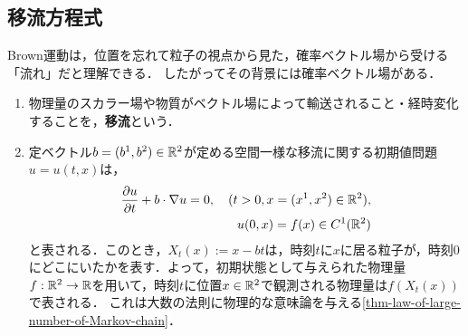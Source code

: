 \documentclass[uplatex,dvipdfmx]{jsreport}
\begin{document}
\subsection{移流方程式}

\begin{tcolorbox}[colframe=ForestGreen, colback=ForestGreen!10!white,breakable,colbacktitle=ForestGreen!40!white,coltitle=black,fonttitle=\bfseries\sffamily,
title=]
    Brown運動は，位置を忘れて粒子の視点から見た，確率ベクトル場から受ける「流れ」だと理解できる．
    したがってその背景には確率ベクトル場がある．
\end{tcolorbox}

\begin{definition}\mbox{}
    \begin{enumerate}
        \item 物理量のスカラー場や物質がベクトル場によって輸送されること・経時変化することを，\textbf{移流}という．
        \item 定ベクトル$b=(b^1,b^2)\in\mathbb{R}^2$が定める空間一様な移流に関する初期値問題$u=u(t,x)$は，
        \begin{align*}
            \frac{\partial u}{\partial t}+b\cdot\nabla u=0,\quad(t>0,x=(x^1,x^2)\in\mathbb{R}^2),\\
            u(0,x)=f(x)\in C^1(\mathbb{R}^2)
        \end{align*}
        と表される．このとき，$X_t(x):=x-bt$は，時刻$t$に$x$に居る粒子が，時刻$0$にどこにいたかを表す．よって，初期状態として与えられた物理量$f:\mathbb{R}^2\to\mathbb{R}$を用いて，時刻$t$に位置$x\in\mathbb{R}^2$で観測される物理量は$f(X_t(x))$で表される．
        これは大数の法則に物理的な意味論を与える\ref{thm-law-of-large-number-of-Markov-chain}．
    \end{enumerate}
\end{definition}
\end{document}
